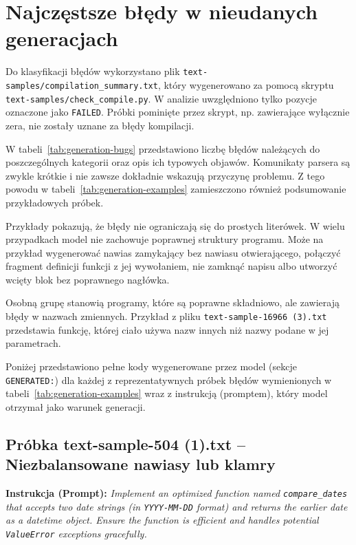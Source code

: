 
\section{Najczęstsze błędy w nieudanych generacjach}
\label{app:bledy-generacji}

Do klasyfikacji błędów wykorzystano plik \texttt{text-samples/compilation\_summary.txt}, który wygenerowano za pomocą skryptu \texttt{text-samples/check\_compile.py}. W analizie uwzględniono tylko pozycje oznaczone jako \texttt{FAILED}. Próbki pominięte przez skrypt, np. zawierające wyłącznie zera, nie zostały uznane za błędy kompilacji.

W tabeli~\ref{tab:generation-bugs} przedstawiono liczbę błędów należących do poszczególnych kategorii oraz opis ich typowych objawów. Komunikaty parsera są zwykle krótkie i nie zawsze dokładnie wskazują przyczynę problemu. Z tego powodu w tabeli~\ref{tab:generation-examples} zamieszczono również podsumowanie przykładowych próbek.





Przykłady pokazują, że błędy nie ograniczają się do prostych literówek. W wielu przypadkach model nie zachowuje poprawnej struktury programu. Może na przykład wygenerować nawias zamykający bez nawiasu otwierającego, połączyć fragment definicji funkcji z jej wywołaniem, nie zamknąć napisu albo utworzyć wcięty blok bez poprawnego nagłówka.

Osobną grupę stanowią programy, które są poprawne składniowo, ale zawierają błędy w nazwach zmiennych. Przykład z pliku \texttt{text-sample-16966 (3).txt} przedstawia funkcję, której ciało używa nazw innych niż nazwy podane w jej parametrach.

Poniżej przedstawiono pełne kody wygenerowane przez model (sekcje \texttt{GENERATED:}) dla każdej z reprezentatywnych próbek błędów wymienionych w tabeli~\ref{tab:generation-examples} wraz z instrukcją (promptem), który model otrzymał jako warunek generacji.


\subsection{Próbka text-sample-504 (1).txt -- Niezbalansowane nawiasy lub klamry}
\label{sec:lst:text-sample-504-1}
\textbf{Instrukcja (Prompt):} \textit{Implement an optimized function named \texttt{compare\_dates} that accepts two date strings (in \texttt{YYYY-MM-DD} format) and returns the earlier date as a datetime object. Ensure the function is efficient and handles potential \texttt{ValueError} exceptions gracefully.}

